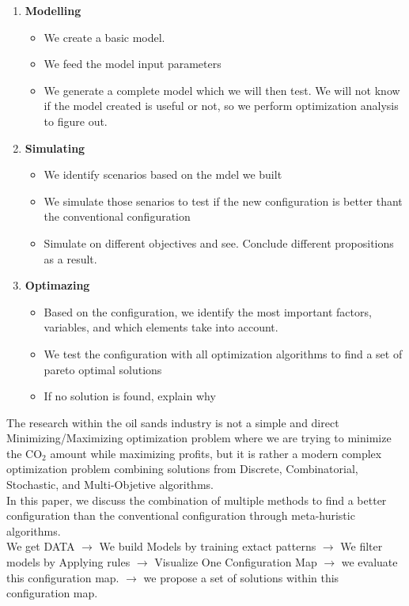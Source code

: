 \documentclass[12pt]{article}
\begin{document}
\begin{enumerate}
\item {\bf Modelling} 
\begin{itemize}
\item We create a basic model.  
\item We feed the model input parameters
\item We generate a complete model which we will then test. We will not know if the model created is useful or not, so we perform optimization analysis to figure out. 
\end{itemize}

\item {\bf Simulating} 
\begin{itemize}
\item We identify scenarios based on the mdel we built 
\item We simulate those senarios to test if the new configuration is better thant the conventional configuration
\item Simulate on different objectives and see. Conclude different propositions as a result.
\end{itemize}

\item {\bf Optimazing} 
\begin{itemize}
\item Based on the configuration, we identify the most important factors, variables, and which elements take into account. 
\item We test the configuration with all optimization algorithms to find a set of pareto optimal solutions
\item If no solution is found, explain why
\end{itemize}
\end{enumerate}

The research within the oil sands industry is not a simple and direct Minimizing/Maximizing optimization problem where we are trying to minimize the CO$_2$ amount while maximizing profits, but it is rather a modern complex optimization problem combining solutions from Discrete, Combinatorial, Stochastic, and Multi-Objetive algorithms. \\

In this paper, we discuss the combination of multiple methods to find a better configuration than the conventional configuration through meta-huristic algorithms. \\

We get DATA $\rightarrow$ We build Models by training extact patterns $\rightarrow$ We filter models by Applying rules $\rightarrow$ Visualize One Configuration Map $\rightarrow$ we evaluate this configuration map.  $\rightarrow$ we propose a set of solutions within this configuration map. 
\end{document}
